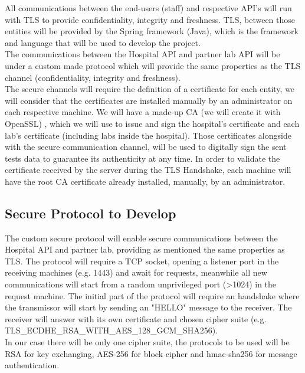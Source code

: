 All communications between the end-users (staff) and respective API's will run with TLS to provide confidentiality, integrity and freshness. TLS, between those entities will be provided by the Spring framework\cite{springmvc} (Java)\cite{java}, which is the framework and language that will be used to develop the project. \\

The communications between the Hospital API and partner lab API will be under a custom made protocol which will provide the same properties as the TLS channel (confidentiality, integrity and freshness). \\
	
The secure channels will require the definition of a certificate for each entity, we will consider that the certificates are installed manually by an administrator on each respective machine.
We will have a made-up CA (we will create it with OpenSSL\cite{openssl}) , which we will use to issue and sign the hospital's certificate and each lab's certificate (including labs inside the hospital). Those certificates alongside with the secure communication channel, will be used to digitally sign the sent tests data to guarantee its authenticity at any time.
In order to validate the certificate received by the server during the TLS Handshake, each machine will have the root CA certificate already installed, manually, by an administrator.\\ 
 
\subsection{Secure Protocol to Develop}
The custom secure protocol will enable secure communications between the Hospital API and partner lab, providing as mentioned the same properties as TLS.
The protocol will require a TCP socket, opening a listener port in the receiving machines (e.g. 1443) and await for requests, meanwhile all new communications will start from a random unprivileged port (>1024) in the request machine. The initial part of the protocol will require an handshake where the transmissor will start by sending an "HELLO" message to the receiver. The receiver will answer with its own certificate and chosen cipher suite (e.g. TLS\_ECDHE\_RSA\_WITH\_AES\_128\_GCM\_SHA256). \\

In our case there will be only one cipher suite, the protocols to be used will be RSA for key exchanging, AES-256 for block cipher and hmac-sha256 for message authentication. \\

